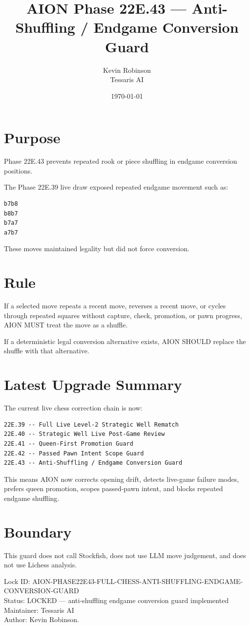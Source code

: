 \documentclass[11pt,a4paper]{article}
\title{\textbf{AION Phase 22E.43 --- Anti-Shuffling / Endgame Conversion Guard}}
\author{Kevin Robinson\\Tessaris AI}
\date{\today}
\begin{document}
\maketitle

\section{Purpose}

Phase 22E.43 prevents repeated rook or piece shuffling in endgame conversion positions.

The Phase 22E.39 live draw exposed repeated endgame movement such as:

\begin{verbatim}
b7b8
b8b7
b7a7
a7b7
\end{verbatim}

These moves maintained legality but did not force conversion.

\section{Rule}

If a selected move repeats a recent move, reverses a recent move, or cycles through repeated squares without capture, check, promotion, or pawn progress, AION MUST treat the move as a shuffle.

If a deterministic legal conversion alternative exists, AION SHOULD replace the shuffle with that alternative.

\section{Latest Upgrade Summary}

The current live chess correction chain is now:

\begin{verbatim}
22E.39 -- Full Live Level-2 Strategic Well Rematch
22E.40 -- Strategic Well Live Post-Game Review
22E.41 -- Queen-First Promotion Guard
22E.42 -- Passed Pawn Intent Scope Guard
22E.43 -- Anti-Shuffling / Endgame Conversion Guard
\end{verbatim}

This means AION now corrects opening drift, detects live-game failure modes, prefers queen promotion, scopes passed-pawn intent, and blocks repeated endgame shuffling.

\section{Boundary}

This guard does not call Stockfish, does not use LLM move judgement, and does not use Lichess analysis.

\bigskip

\noindent
Lock ID: AION-PHASE22E43-FULL-CHESS-ANTI-SHUFFLING-ENDGAME-CONVERSION-GUARD\\
Status: LOCKED --- anti-shuffling endgame conversion guard implemented\\
Maintainer: Tessaris AI\\
Author: Kevin Robinson.
\end{document}
